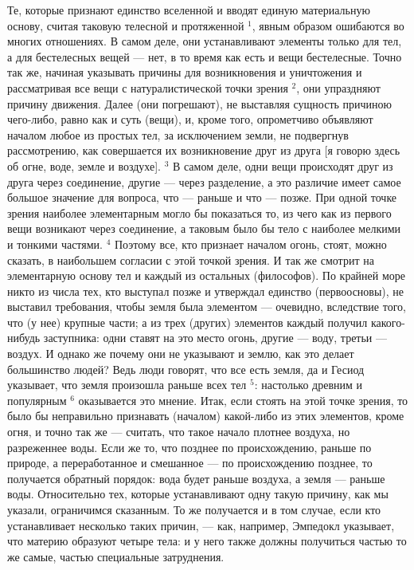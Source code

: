 \documentclass[oneside, 17pt, dvipsnames]{extbook}
\begin{document}
Те, которые признают единство вселенной и вводят единую материальную основу, считая таковую телесной и протяженной $^1$, явным образом ошибаются во многих отношениях. В самом деле, они устанавливают элементы только для тел, а для бестелесных вещей — нет, в то время как есть и вещи бестелесные. Точно так же, начиная указывать причины для возникновения и уничтожения и рассматривая все вещи с натуралистической точки зрения $^2$, они упраздняют причину движения. Далее (они погрешают), не выставляя сущность причиною чего-либо, равно как и суть (вещи), и, кроме того, опрометчиво объявляют началом любое из простых тел, за исключением земли, не подвергнув рассмотрению, как совершается их возникновение друг из друга [я говорю здесь об огне, воде, земле и воздухе]. $^3$ В самом деле, одни вещи происходят друг из друга через соединение, другие — через разделение, а это различие имеет самое большое значение для вопроса, что — раньше и что — позже. При одной точке зрения наиболее элементарным могло бы показаться то, из чего как из первого вещи возникают через соединение, а таковым было бы тело с наиболее мелкими и тонкими частями. $^4$ Поэтому все, кто признает началом огонь, стоят, можно сказать, в наибольшем согласии с этой точкой зрения. И так же смотрит на элементарную основу тел и каждый из остальных (философов). По крайней море никто из числа тех, кто выступал позже и утверждал единство (первоосновы), не выставил требования, чтобы земля была элементом — очевидно, вследствие того, что (у нее) крупные части; а из трех (других) элементов каждый получил какого-нибудь заступника: одни ставят на это место огонь, другие — воду, третьи — воздух. И однако же почему они не указывают и землю, как это делает большинство людей? Ведь люди говорят, что все есть земля, да и Гесиод указывает, что земля произошла раньше всех тел $^5$: настолько древним и популярным $^6$ оказывается это мнение. Итак, если стоять на этой точке зрения, то было бы неправильно признавать (началом) какой-либо из этих элементов, кроме огня, и точно так же — считать, что такое начало плотнее воздуха, но разреженнее воды. Если же то, что позднее по происхождению, раньше по природе, а переработанное и смешанное — по происхождению позднее, то получается обратный порядок: вода будет раньше воздуха, а земля — раньше воды. Относительно тех, которые устанавливают одну такую причину, как мы указали, ограничимся сказанным. То же получается и в том случае, если кто устанавливает несколько таких причин, — как, например, Эмпедокл указывает, что материю образуют четыре тела: и у него также должны получиться частью то же самые, частью специальные затруднения.
\end{document}
